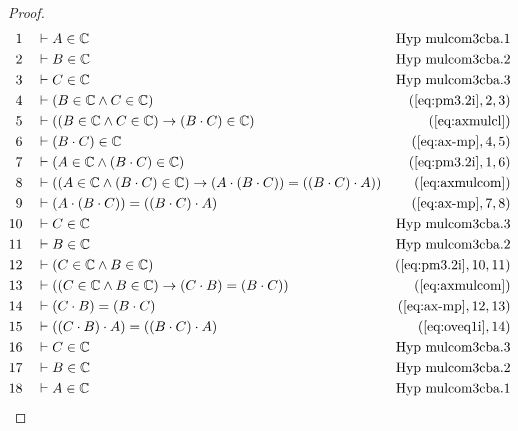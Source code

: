 \begin{proof}
\begin{align}
  1 &&  & \vdash A \in \mathbb{C}&\text{Hyp~mulcom3cba.1}\notag%
  \\ 2 &&  & \vdash B \in
\mathbb{C}&\text{Hyp~mulcom3cba.2}\notag%
  \\ 3 &&  & \vdash C \in
\mathbb{C}&\text{Hyp~mulcom3cba.3}\notag%
  \\ 4 &&  & \vdash ( B \in \mathbb{C} \wedge C \in \mathbb{C} )&(\mbox{\ref{eq:pm3.2i}},2,3)\notag
  \\ 5 &&  & \vdash ( ( B \in \mathbb{C} \wedge C \in \mathbb{C} ) \rightarrow ( B \cdot C ) \in \mathbb{C} )&(\mbox{\ref{eq:axmulcl}})\notag
  \\ 6 &&  & \vdash ( B \cdot C ) \in \mathbb{C}&(\mbox{\ref{eq:ax-mp}},4,5)\notag
  \\ 7 &&  & \vdash ( A \in \mathbb{C} \wedge ( B \cdot C ) \in \mathbb{C} )&(\mbox{\ref{eq:pm3.2i}},1,6)\notag
  \\ 8 &&  & \vdash ( ( A \in \mathbb{C} \wedge ( B \cdot C ) \in \mathbb{C} ) \rightarrow ( A \cdot ( B \cdot C ) ) = ( ( B \cdot C ) \cdot A ) )&(\mbox{\ref{eq:axmulcom}})\notag
  \\ 9 &&  & \vdash ( A \cdot ( B \cdot C ) ) = ( ( B \cdot C ) \cdot A )&(\mbox{\ref{eq:ax-mp}},7,8)\notag
  \\ 10 &&  & \vdash C \in
\mathbb{C}&\text{Hyp~mulcom3cba.3}\notag%
  \\ 11 &&  & \vdash B \in
\mathbb{C}&\text{Hyp~mulcom3cba.2}\notag%
  \\ 12 &&  & \vdash ( C \in \mathbb{C} \wedge B \in \mathbb{C} )&(\mbox{\ref{eq:pm3.2i}},10,11)\notag
  \\ 13 &&  & \vdash ( ( C \in \mathbb{C} \wedge B \in \mathbb{C} ) \rightarrow ( C \cdot B ) = ( B \cdot C ) )&(\mbox{\ref{eq:axmulcom}})\notag
  \\ 14 &&  & \vdash ( C \cdot B ) = ( B \cdot C )&(\mbox{\ref{eq:ax-mp}},12,13)\notag
  \\ 15 &&  & \vdash ( ( C \cdot B ) \cdot A ) = ( ( B \cdot C ) \cdot A )&(\mbox{\ref{eq:oveq1i}},14)\notag
  \\ 16 &&  & \vdash C \in
\mathbb{C}&\text{Hyp~mulcom3cba.3}\notag%
  \\ 17 &&  & \vdash B \in
\mathbb{C}&\text{Hyp~mulcom3cba.2}\notag%
  \\ 18 &&  & \vdash A \in
\mathbb{C}&\text{Hyp~mulcom3cba.1}\notag%

\end{align}
\end{proof}
